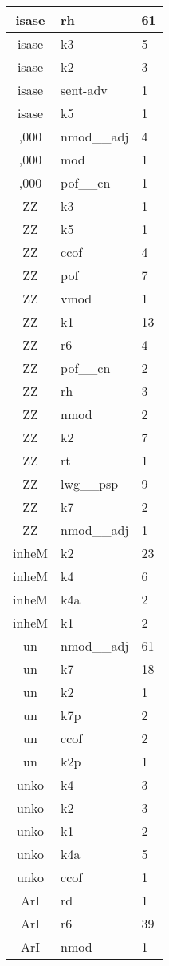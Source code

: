 \documentclass[a4 paper]{article}
\begin{document}
\begin{longtable}{cp{}p{}}
isase & rh & 61\\ \midrule isase & k3 & 5\\ \midrule isase & k2 & 3\\ \midrule isase & sent-adv & 1\\ \midrule isase & k5 & 1\\ \midrule 
,000 & nmod\_\_adj & 4\\ \midrule ,000 & mod & 1\\ \midrule ,000 & pof\_\_cn & 1\\ \midrule 
ZZ & k3 & 1\\ \midrule ZZ & k5 & 1\\ \midrule ZZ & ccof & 4\\ \midrule ZZ & pof & 7\\ \midrule ZZ & vmod & 1\\ \midrule ZZ & k1 & 13\\ \midrule ZZ & r6 & 4\\ \midrule ZZ & pof\_\_cn & 2\\ \midrule ZZ & rh & 3\\ \midrule ZZ & nmod & 2\\ \midrule ZZ & k2 & 7\\ \midrule ZZ & rt & 1\\ \midrule ZZ & lwg\_\_psp & 9\\ \midrule ZZ & k7 & 2\\ \midrule ZZ & nmod\_\_adj & 1\\ \midrule 
inheM & k2 & 23\\ \midrule inheM & k4 & 6\\ \midrule inheM & k4a & 2\\ \midrule inheM & k1 & 2\\ \midrule 
un & nmod\_\_adj & 61\\ \midrule un & k7 & 18\\ \midrule un & k2 & 1\\ \midrule un & k7p & 2\\ \midrule un & ccof & 2\\ \midrule un & k2p & 1\\ \midrule 
unko & k4 & 3\\ \midrule unko & k2 & 3\\ \midrule unko & k1 & 2\\ \midrule unko & k4a & 5\\ \midrule unko & ccof & 1\\ \midrule 
ArI & rd & 1\\ \midrule ArI & r6 & 39\\ \midrule ArI & nmod & 1\\ \midrule 

\end{longtable}
\end{document}
